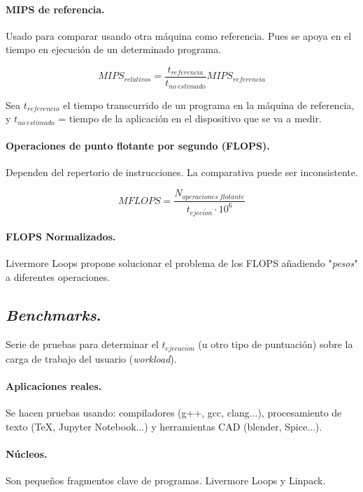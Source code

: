 \documentclass{article}
\begin{document}
\begin{multicols}{2}
		\paragraph{MIPS de referencia.}
		Usado para comparar usando otra máquina como referencia. Pues se apoya en el tiempo en ejecución de un determinado programa.
		
		\begin{displaymath}
			MIPS_{relativos} = \frac {t_{referencia}} {t_{no\ estimado}} MIPS_{referencia}
		\end{displaymath}
		
		Sea ${t_{referencia}}$ el tiempo transcurrido de un programa en la máquina de referencia, y
		${t_{no\ estimado}}$ = tiempo de la aplicación en el dispositivo que se va a medir.
		
		\paragraph{Operaciones de punto flotante por segundo (FLOPS).}
		Dependen del repertorio de instrucciones. La comparativa puede ser inconsistente.
		
		\begin{displaymath}
			MFLOPS = \frac {N_{operaciones\ flotante}} {t_{ejeci\acute{o}n} \cdot 10^6}
		\end{displaymath}
		
		\paragraph{FLOPS Normalizados.}
		Livermore Loops propone solucionar el problema de los FLOPS añadiendo "\textit{pesos}" a diferentes operaciones.
		
		\subsection{\textit{Benchmarks}.}
		Serie de pruebas para determinar el $t_{ejecuci\acute{o}n}$ (u otro tipo de puntuación) sobre la carga de trabajo del usuario (\textit{workload}).
		
		\paragraph{Aplicaciones reales.}
		Se hacen pruebas usando: compiladores (g++, gcc, clang...), procesamiento de texto (TeX, Jupyter Notebook...) y herramientas CAD (blender, Spice...).
		
		\paragraph{Núcleos.}
		Son pequeños fragmentos clave de programas. Livermore Loops y Linpack.
		

\end{multicols}
\end{document}
